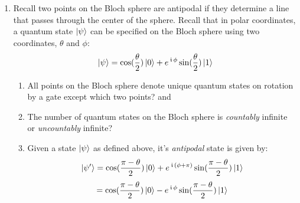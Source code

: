 \documentclass[12pt]{article}
\begin{document}
\begin{enumerate}[font=\bfseries]
\begin{enumerate}[label=\theenumi.\arabic*]
    \end{enumerate}
    \item {} Recall two points on the Bloch sphere are antipodal if they determine a line that passes through the center of the sphere. Recall that in polar coordinates, a quantum state $\ket{\psi}$ can be specified on the Bloch sphere using two coordinates, $\theta$ and $\phi$:
    \[\ket{\psi} = \cos(\frac{\theta}{2})\ket{0}
    + e^{\,\kern 0.5pt\mathfrak{i}\,\phi}\sin(\frac{\theta}{2})\ket{1}\]
    \begin{enumerate}[label=\theenumi.\arabic*]
        \item {} All points on the Bloch sphere denote unique quantum states on rotation by a \PauliZ{} gate except which two points? \Ans{\QZero{}} and \Ans{\QOne{}}
        \item {} The number of quantum states on the Bloch sphere is \emph{countably} infinite or \emph{uncountably} infinite? 
        \item {} Given a state $\ket{\psi}$ as defined above, it's \emph{antipodal} state is given by:
        \[ \ket{\psi'} = \cos({\frac{\pi - \theta}{2})\ket{0}+e^{\,\kern 0.5pt\mathfrak{i}\,(\phi + \pi)}\sin({\frac{\pi - \theta}{2}})\ket{1}}
        \]
        \[
        = \cos({\frac{\pi - \theta}{2})\ket{0}-e^{\,\kern 0.5pt\mathfrak{i}\,\phi}\sin({\frac{\pi - \theta}{2}})\ket{1}}
        \]
        

\end{enumerate}
\end{enumerate}
\end{document}
